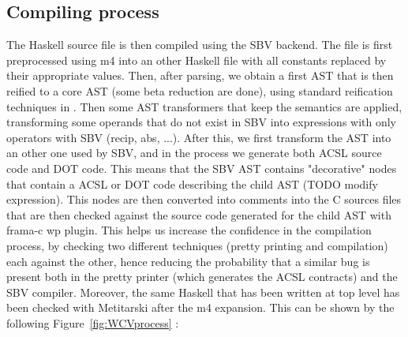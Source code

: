 \subsection{Compiling process}

The Haskell source file is then compiled using the SBV backend. The file is first preprocessed using m4 into an other Haskell file with all constants replaced by their appropriate values. Then, after parsing, we obtain a first AST that is then reified to a core AST (some beta reduction are done), using standard reification techniques in \cite{Copilot06}. Then some AST transformers that keep the semantics are applied, transforming some operands that do not exist in SBV into expressions with only operators with SBV (recip, abs, ...). After this, we first transform the AST into an other one used by SBV, and in the process we generate both ACSL source code and DOT code. This means that the SBV AST contains "decorative" nodes that contain a ACSL or DOT code describing the child AST (TODO modify expression). 
This nodes are then converted into comments into the C sources files that are then checked against the source code generated for the child AST with frama-c wp plugin. This helps us increase the confidence in the compilation process, by checking two different techniques (pretty printing and compilation) each against the other, hence reducing the probability that a similar bug is present both in the pretty printer (which generates the ACSL contracts) and the SBV compiler. Moreover, the same Haskell that has been written at top level has been checked with Metitarski after the m4 expansion. This can be shown by the following Figure~\ref{fig:WCVprocess} :


